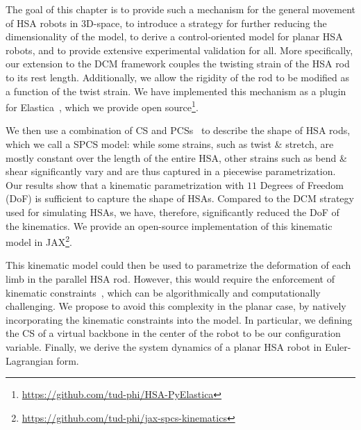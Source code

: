 The goal of this chapter is to provide such a mechanism for the general movement of \gls{HSA} robots in 3D-space, to introduce a strategy for further reducing the dimensionality of the model, to derive a control-oriented model for planar \gls{HSA} robots, and to provide extensive experimental validation for all. 
More specifically, our extension to the \gls{DCM} framework couples the twisting strain of the \gls{HSA} rod to its rest length. %
Additionally, we allow the rigidity of the rod to be modified as a function of the twist strain. %
We have implemented this mechanism as a plugin for Elastica~\citep{naughton2021elastica}, which we provide open source\footnote{\url{https://github.com/tud-phi/HSA-PyElastica}}. 

We then use a combination of \gls{CS} and \glspl{PCS}~\citep{renda2018discrete} to describe the shape of \gls{HSA} rods, which we call a \gls{SPCS} model: while some strains, such as twist \& stretch, are mostly constant over the length of the entire \gls{HSA}, other strains such as bend \& shear significantly vary and are thus captured in a piecewise parametrization. 
Our results show that a kinematic parametrization with $11$ Degrees of Freedom (DoF) is sufficient to capture the shape of \glspl{HSA}.
Compared to the \gls{DCM} strategy used for simulating \glspl{HSA}, we have, therefore, significantly reduced the DoF of the kinematics.
We provide an open-source implementation of this kinematic model in JAX\footnote{\scriptsize \url{https://github.com/tud-phi/jax-spcs-kinematics}}.

This kinematic model could then be used to parametrize the deformation of each limb in the parallel \gls{HSA} rod.
However, this would require the enforcement of kinematic constraints~\cite {armanini2021discrete}, which can be algorithmically and computationally challenging.
We propose to avoid this complexity in the planar case, by natively incorporating the kinematic constraints into the model. In particular, we 
defining the \gls{CS} of a virtual backbone in the center of the robot to be our configuration variable.
Finally, we derive the system dynamics of a planar \gls{HSA} robot in Euler-Lagrangian form.

